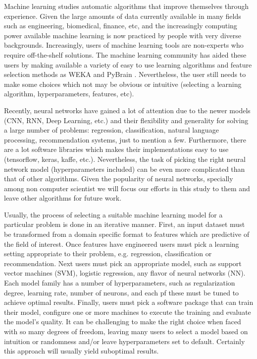 \documentclass{article}
\begin{document}
Machine learning studies automatic algorithms that improve themselves through experience. Given the large amounts of data currently available in many fields such as engineering, biomedical, finance, etc, and the increasingly computing power available machine learning is now  practiced by people with very diverse backgrounds. Increasingly, users of machine learning tools are non-experts who require off-the-shelf solutions. The machine learning community has aided these users by making available a variety of easy to use learning algorithms and feature selection methods as WEKA \cite{Hall2009} and PyBrain \cite{Schaul2010}. Nevertheless, the user still needs to make some choices which not may be obvious or intuitive (selecting a learning algorithm, hyperparameters, features, etc).

Recently, neural networks have gained a lot of attention due to the newer models (CNN, RNN, Deep Learning, etc.) and their flexibility and generality for solving a large number of problems: regression, classification, natural language processing, recommendation systems, just to mention a few. Furthermore, there are a lot software libraries which makes their implementations easy to use (tensorflow, keras, kaffe, etc.). Nevertheless, the task of picking the right neural network model (hyperparameters included) can be even more complicated than that of other algorithms. Given the popularity of neural networks, specially among non computer scientist we will focus our efforts in this study to them and leave other algorithms for future work.

Usually, the process of selecting a suitable machine learning model for a particular problem is done in an iterative manner. First, an input dataset must be transformed from a domain specific format to features which are predictive of the field of interest. Once features have engineered users must pick a learning setting appropriate to their problem, e.g. regression, classification or recommendation. Next users must pick an appropriate model, such as support vector machines (SVM), logistic regression, any flavor of neural networks (NN). Each model family has a number of hyperparameters, such as regularization degree, learning rate, number of neurons, and each pf these must be tuned to achieve optimal results. Finally, users must pick a software package that can train their model, configure one or more machines to execute the training and evaluate the model's quality. It can be challenging to make the right choice when faced with so many degrees of freedom, leaving many users to select a model based on intuition or randomness and/or leave hyperparameters set to default. Certainly this approach will usually yield suboptimal results.
\end{document}
